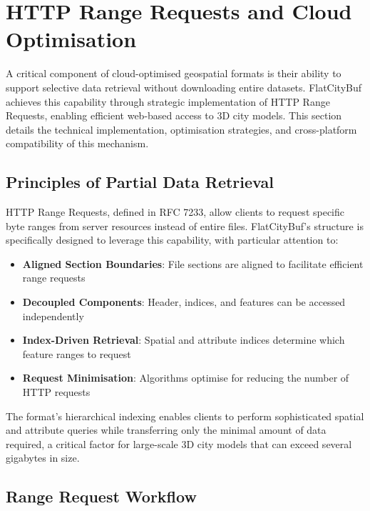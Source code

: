 \section{HTTP Range Requests and Cloud Optimisation}
\label{methodology:http_range_requests}

A critical component of cloud-optimised geospatial formats is their ability to support selective data retrieval without downloading entire datasets. FlatCityBuf achieves this capability through strategic implementation of HTTP Range Requests, enabling efficient web-based access to 3D city models. This section details the technical implementation, optimisation strategies, and cross-platform compatibility of this mechanism.

\subsection{Principles of Partial Data Retrieval}
\label{methodology:http_range_requests:partial_retrieval_principles}

HTTP Range Requests, defined in RFC 7233, allow clients to request specific byte ranges from server resources instead of entire files. FlatCityBuf's structure is specifically designed to leverage this capability, with particular attention to:

\begin{itemize}
    \item \textbf{Aligned Section Boundaries}: File sections are aligned to facilitate efficient range requests
    \item \textbf{Decoupled Components}: Header, indices, and features can be accessed independently
    \item \textbf{Index-Driven Retrieval}: Spatial and attribute indices determine which feature ranges to request
    \item \textbf{Request Minimisation}: Algorithms optimise for reducing the number of HTTP requests
\end{itemize}

The format's hierarchical indexing enables clients to perform sophisticated spatial and attribute queries while transferring only the minimal amount of data required, a critical factor for large-scale 3D city models that can exceed several gigabytes in size.

\subsection{Range Request Workflow}
\label{methodology:http_range_requests:range_request_workflow}

